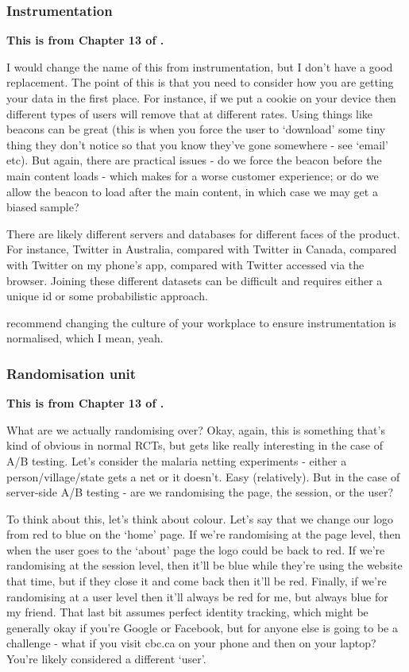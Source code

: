 \documentclass[
]{book}
\begin{document}
\hypertarget{instrumentation}{%
\subsubsection{Instrumentation}\label{instrumentation}}

\textbf{This is from Chapter 13 of \citet{kohavi}.}

I would change the name of this from instrumentation, but I don't have a good replacement. The point of this is that you need to consider how you are getting your data in the first place. For instance, if we put a cookie on your device then different types of users will remove that at different rates. Using things like beacons can be great (this is when you force the user to `download' some tiny thing they don't notice so that you know they've gone somewhere - see `email' etc). But again, there are practical issues - do we force the beacon before the main content loads - which makes for a worse customer experience; or do we allow the beacon to load after the main content, in which case we may get a biased sample?

There are likely different servers and databases for different faces of the product. For instance, Twitter in Australia, compared with Twitter in Canada, compared with Twitter on my phone's app, compared with Twitter accessed via the browser. Joining these different datasets can be difficult and requires either a unique id or some probabilistic approach.

\citet[p.~165]{kohavi} recommend changing the culture of your workplace to ensure instrumentation is normalised, which I mean, yeah.

\hypertarget{randomisation-unit}{%
\subsubsection{Randomisation unit}\label{randomisation-unit}}

\textbf{This is from Chapter 13 of \citet{kohavi}.}

What are we actually randomising over? Okay, again, this is something that's kind of obvious in normal RCTs, but gets like really interesting in the case of A/B testing. Let's consider the malaria netting experiments - either a person/village/state gets a net or it doesn't. Easy (relatively). But in the case of server-side A/B testing - are we randomising the page, the session, or the user?

To think about this, let's think about colour. Let's say that we change our logo from red to blue on the `home' page. If we're randomising at the page level, then when the user goes to the `about' page the logo could be back to red. If we're randomising at the session level, then it'll be blue while they're using the website that time, but if they close it and come back then it'll be red. Finally, if we're randomising at a user level then it'll always be red for me, but always blue for my friend. That last bit assumes perfect identity tracking, which might be generally okay if you're Google or Facebook, but for anyone else is going to be a challenge - what if you visit cbc.ca on your phone and then on your laptop? You're likely considered a different `user'.
\end{document}
